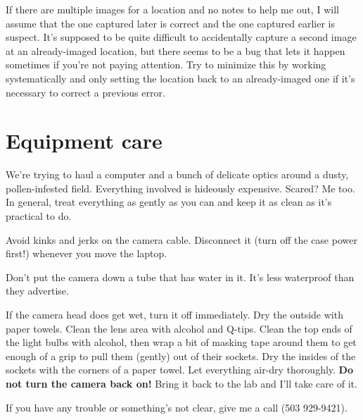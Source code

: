 \documentclass[11pt]{article}
\begin{document}
	If there are multiple images for a location and no notes to help me out, I will assume that the one captured later is correct and the one captured earlier is suspect. It's supposed to be quite difficult to accidentally capture a second image at an already-imaged location, but there seems to be a bug that lets it happen sometimes if you're not paying attention. Try to minimize this by working systematically and only setting the location back to an already-imaged one if it's necessary to correct a previous error.


\section{Equipment care}
	We're trying to haul a computer and a bunch of delicate optics around a dusty, pollen-infested field. Everything involved is hideously expensive. Scared? Me too. In general, treat everything as gently as you can and keep it as clean as it's practical to do.
	
	Avoid kinks and jerks on the camera cable. Disconnect it (turn off the case power first!) whenever you move the laptop.
	
	Don't put the camera down a tube that has water in it. It's less waterproof than they advertise. 
	
	If the camera head does get wet, turn it off immediately. Dry the outside with paper towels. Clean the lens area with alcohol and Q-tips. Clean the top ends of the light bulbs with alcohol, then wrap a bit of masking tape around them to get enough of a grip to pull them (gently) out of their sockets. Dry the insides of the sockets with the corners of a paper towel. Let everything air-dry thoroughly. \textbf{Do not turn the camera back on!} Bring it back to the lab and I'll take care of it.
	
	
If you have any trouble or something's not clear, give me a call (503 929-9421). 
\end{document}
